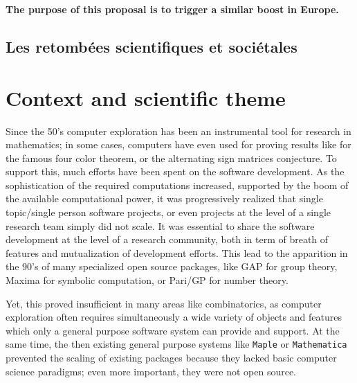 \documentclass[a4,12pt]{amsart}
\newcommand{\TODO}[2][To do: ]{{\textcolor{red}{\textbf{#1#2}}}}
\begin{document}
\medskip
\textbf{The purpose of this proposal is to trigger a similar boost in
  Europe.}




\subsection{Les retombées scientifiques et sociétales}

\clearpage

\section{Context and scientific theme}


Since the 50's computer exploration has been an instrumental tool for
research in mathematics; in some cases, computers have even used for
proving results like for the famous four color theorem, or the
alternating sign matrices conjecture.
To support this, much efforts have been spent on the software
development. As the sophistication of the required computations
increased, supported by the boom of the available computational power,
it was progressively realized that single topic/single person software
projects, or even projects at the level of a single research team
simply did not scale. It was essential to share the software
development at the level of a research community, both in term of
breath of features and mutualization of development efforts. This lead
to the apparition in the 90's of many specialized open source
packages, like GAP for group theory, Maxima for symbolic computation, or
Pari/GP for number theory.

Yet, this proved insufficient in many areas like combinatorics, as
computer exploration often requires simultaneously a wide variety of
objects and features which only a general purpose software system can
provide and support. At the same time, the then existing general
purpose systems like \texttt{Maple} or \texttt{Mathematica} prevented
the scaling of existing packages because they lacked basic computer
science paradigms; even more important, they were not open source.
\end{document}
